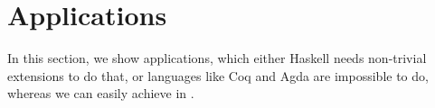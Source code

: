 \visiblecomments

\newlength{\blanklineskip}
\setlength{\blanklineskip}{0.66084ex}

\newcommand{\hsindent}[1]{\quad}%
\let\hspre\empty
\let\hspost\empty
\newcommand{\NB}{\textbf{NB}}
\newcommand{\Todo}[1]{$\langle$\textbf{To do:}~#1$\rangle$}

\EndFmtInput
\makeatother
%



\section{Applications}
\label{sec:app}

In this section, we show applications, which either Haskell needs non-trivial extensions to do that, or languages like Coq and Agda are impossible to do, whereas we can easily achieve in \name.






